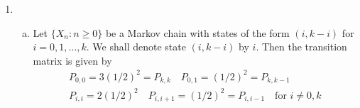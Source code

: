 \documentclass[a4paper,10pt]{article}
\theoremstyle{definition}
\begin{document}
\begin{enumerate}
\begin{enumerate}[(a)]
\item
\item
\end{enumerate}
\item
\begin{enumerate}[(a)]
\item Let $\{X_n:n\geq0\}$ be a Markov chain with states of the form $(i,k-i)$ for $i=0,1,\ldots, k$. We shall denote state $(i,k-i)$ by $i$. Then the transition matrix is given by
\begin{align*}
P_{0,0}=3(1/2)^2=P_{k,k}\quad P_{0,1}=(1/2)^2=P_{k,k-1}\\
P_{i,i}=2(1/2)^2\quad P_{i,i+1}=(1/2)^2=P_{i,i-1}\quad\text{for $i \neq 0, k$}\\
\end{align*}


\end{enumerate}
\end{enumerate}
\end{document}

